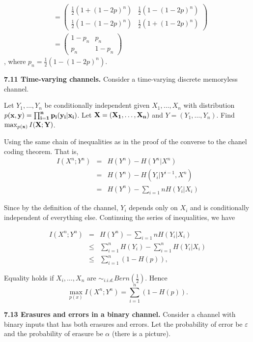 \documentclass[10pt]{article}
\begin{document}
\begin{tiny}
\begin{multicols}{3}
\begin{align*}
&= \begin{pmatrix}
        \frac{1}{2}(1 + (1-2p)^n) & \frac{1}{2}(1 - (1-2p)^n) \\
        \frac{1}{2}(1 - (1-2p)^n) & \frac{1}{2}(1 + (1-2p)^n) \end{pmatrix}  \\
    &= \begin{pmatrix} 1 - p_n & p_n \\
        p_n & 1 - p_n \end{pmatrix} 
\end{align*} , where  $p_n = \frac{1}{2}(1 - (1-2p)^n)$.

\textbf{\scriptsize 7.11 Time-varying channels.}
Consider a time-varying discrete memoryless channel.

Let $Y_1,\dots,Y_n$ be conditionally independent given $X_1,\dots,X_n$ with distribution $p(\bf{x}, \bf{y}) = \prod_{i=1}^{n}p_i(y_i|x_i)$. Let $\bf{X} = (X_1,\dots,X_n)$ and $Y=(Y_1,\dots,Y_n)$. Find $\max_{p(\bf{x})} I(\bf{X};\bf{Y})$.

Using the same chain of inequalities as in the proof of the converse to the chanel coding theorem. That is,
\begin{eqnarray*}
    I(X^n;Y^n) &=& H(Y^n) - H(Y^n|X^n) \\ 
        &=& H(Y^n) - H(Y_i | Y^{i-1}, X^n)  \\
        &=& H(Y^n) - \sum_{i=1}{n} H(Y_i | X_i)
\end{eqnarray*}

Since by the definition of the channel, $Y_i$ depends only on $X_i$ and is conditionally independent of everything else. Continuing the series of inequalities, we have

\begin{eqnarray*}
    I(X^n;Y^n) &=& H(Y^n) - \sum_{i=1}{n} H(Y_i | X_i) \\
    &\le& \sum_{i=1}^{n} H(Y_i) - \sum_{i=1}^{n}H(Y_i | X_i) \\ 
    &\le& \sum_{i=1}^{n} (1-H(p)),
\end{eqnarray*}

Equality holds if $X_i,\dots,X_n$ are $\sim_{i.i.d.} Bern(\frac{1}{2})$. Hence
\begin{equation*}
    \max_{p(x)} I(X^n; Y^n) = \sum_{i=1}^{n}(1-H(p)).
\end{equation*}

\textbf{\scriptsize 7.13 Erasures and errors in a binary channel.}
Consider a channel with binary inputs that has both erasures and errors. Let the probability of error be $\varepsilon$ and the probability of erasure be $\alpha$ (there is a picture).


\end{multicols}
\end{tiny}
\end{document}
